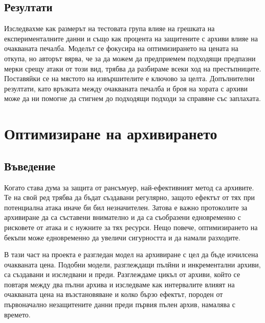 \documentclass[11pt, a4paper]{article}
\theoremstyle{definition}
\begin{document}
		\subsection{Резултати}
			Изследвахме как размерът на тестовата група влияе на грешката на експерименталните данни и също как процента на защитените с архиви влияе на очакваната печалба. Моделът се фокусира на оптимизирането на цената на откупа, но авторът вярва, че за да можем да предприемем подходящи предпазни мерки срещу атаки от този вид, трябва да разбираме всеки ход на престъпниците. Поставяйки се на мястото на извършителите е ключово за целта. Допълнителни резултати, като връзката между очакваната печалба и броя на хората с архиви може да ни помогне да стигнем до подходящи подходи за справяне със заплахата.
	\section{Оптимизиране на архивирането}
		\subsection{Въведение}
			Когато става дума за защита от рансъмуер, най-ефективният метод са архивите. Те на свой ред трябва да бъдат създавани регулярно, защото ефектът от тях при потенциална атака иначе би бил незначителен. Затова е важно протоколите за архивиране да са съставени внимателно и да са съобразени едновременно с рисковете от атака и с нужните за тях ресурси. Нещо повече, оптимизирането на бекъпи може едновременно да увеличи сигурността и да намали разходите.\par
			В тази част на проекта е разгледан модел на архивиране с цел да бъде изчилсена очакваната цена. Подобни модели, разглеждащи пълйни и инкрементални архиви, са създавани и изследвани и преди\cite{nakamura2003optimal}\cite{qian2010optimal}. Разглеждаме цикъл от архиви, който се повтаря между два пълни архива и изследваме как интервалите влияят на очакваната цена на възстановяване и колко бързо ефектът, породен от първоначално незащитените данни преди първия пълен архив, намалява с времето.
\end{document}
